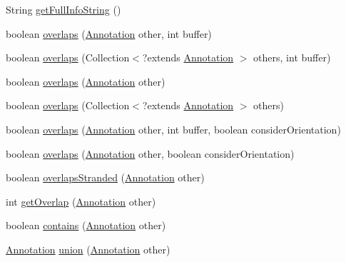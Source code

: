 \begin{DoxyCompactItemize}
\item 
String \hyperlink{interfaceumms_1_1core_1_1annotation_1_1_annotation_ab8039241bfdb54655ba3eebf3a50f14b}{get\+Full\+Info\+String} ()
\item 
boolean \hyperlink{interfaceumms_1_1core_1_1annotation_1_1_annotation_ab0f817e7652b89e2775b988d73106f5c}{overlaps} (\hyperlink{interfaceumms_1_1core_1_1annotation_1_1_annotation}{Annotation} other, int buffer)
\item 
boolean \hyperlink{interfaceumms_1_1core_1_1annotation_1_1_annotation_a53e69da353751c7ca0d920cc1ac9c3c1}{overlaps} (Collection$<$?extends \hyperlink{interfaceumms_1_1core_1_1annotation_1_1_annotation}{Annotation} $>$ others, int buffer)
\item 
boolean \hyperlink{interfaceumms_1_1core_1_1annotation_1_1_annotation_ac97c3bcbabc8c80e7dae08bb4b071fa7}{overlaps} (\hyperlink{interfaceumms_1_1core_1_1annotation_1_1_annotation}{Annotation} other)
\item 
boolean \hyperlink{interfaceumms_1_1core_1_1annotation_1_1_annotation_a2b6b7ada4065359221f0d0065d8dcd70}{overlaps} (Collection$<$?extends \hyperlink{interfaceumms_1_1core_1_1annotation_1_1_annotation}{Annotation} $>$ others)
\item 
boolean \hyperlink{interfaceumms_1_1core_1_1annotation_1_1_annotation_ac45bd8fdeff51b608e53b5f83ec73278}{overlaps} (\hyperlink{interfaceumms_1_1core_1_1annotation_1_1_annotation}{Annotation} other, int buffer, boolean consider\+Orientation)
\item 
boolean \hyperlink{interfaceumms_1_1core_1_1annotation_1_1_annotation_a397323ee5459241af0a5c11224e9623b}{overlaps} (\hyperlink{interfaceumms_1_1core_1_1annotation_1_1_annotation}{Annotation} other, boolean consider\+Orientation)
\item 
boolean \hyperlink{interfaceumms_1_1core_1_1annotation_1_1_annotation_a3d07efae311d47e7e74b61cbad4526db}{overlaps\+Stranded} (\hyperlink{interfaceumms_1_1core_1_1annotation_1_1_annotation}{Annotation} other)
\item 
int \hyperlink{interfaceumms_1_1core_1_1annotation_1_1_annotation_af3b8df9d79d125c32fb4e9500662e819}{get\+Overlap} (\hyperlink{interfaceumms_1_1core_1_1annotation_1_1_annotation}{Annotation} other)
\item 
boolean \hyperlink{interfaceumms_1_1core_1_1annotation_1_1_annotation_adfc487b0ab197c742bbbe39767272b79}{contains} (\hyperlink{interfaceumms_1_1core_1_1annotation_1_1_annotation}{Annotation} other)
\item 
\hyperlink{interfaceumms_1_1core_1_1annotation_1_1_annotation}{Annotation} \hyperlink{interfaceumms_1_1core_1_1annotation_1_1_annotation_acce146fb7b3d2613874d376b4b087505}{union} (\hyperlink{interfaceumms_1_1core_1_1annotation_1_1_annotation}{Annotation} other)

\end{DoxyCompactItemize}
